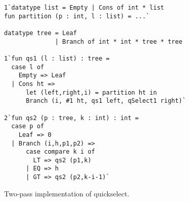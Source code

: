 \begin{figure}
\begin{lstlisting}
1`datatype list = Empty | Cons of int * list
fun partition (p : int, l : list) = ...`

datatype tree = Leaf
              | Branch of int * int * tree * tree

1`fun qs1 (l : list) : tree =
  case l of
    Empty => Leaf
  | Cons ht => 
      let (left,right,i) = partition ht in
      Branch (i, #1 ht, qs1 left, qSelect1 right)`

2`fun qs2 (p : tree, k : int) : int = 
  case p of
    Leaf => 0
  | Branch (i,h,p1,p2) => 
      case compare k i of
        LT => qs2 (p1,k)
      | EQ => h
      | GT => qs2 (p2,k-i-1)`
\end{lstlisting}
\caption{Two-pass implementation of quickselect.}
\label{fig:qs-split}
\end{figure}

